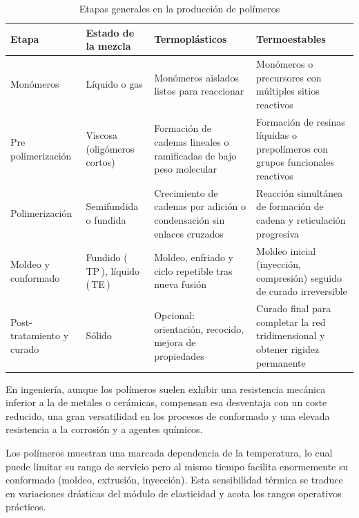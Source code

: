 \begin{table}[h]
  \centering
  \caption{Etapas generales en la producción de polímeros}
  \label{tab:etapas_polimeros}
  \begin{tabular}{|P{2.5cm}|P{3.5cm}|P{4cm}|P{4.5cm}|}
    \hline
    \textbf{Etapa}            & \textbf{Estado de la mezcla}        & \textbf{Termoplásticos}                                                    & \textbf{Termoestables}                                                        \\ \hline
    Monómeros                 & Líquido o gas                       & Monómeros aislados listos para reaccionar                                   & Monómeros o precursores con múltiples sitios reactivos                         \\ \hline
    Pre polimerización         & Viscosa (oligómeros cortos)         & Formación de cadenas lineales o ramificadas de bajo peso molecular & Formación de resinas líquidas o prepolímeros con grupos funcionales reactivos   \\ \hline
    Polimerización            & Semifundida o fundida               & Crecimiento de cadenas por adición o condensación sin enlaces cruzados       & Reacción simultánea de formación de cadena y reticulación progresiva            \\ \hline
    Moldeo y conformado       & Fundido (\,TP\,), líquido (\,TE\,)  & Moldeo, enfriado y ciclo repetible tras nueva fusión                         & Moldeo inicial (inyección, compresión) seguido de curado irreversible          \\ \hline
    Post-tratamiento y curado & Sólido                              & Opcional: orientación, recocido, mejora de propiedades                      & Curado final para completar la red tridimensional y obtener rigidez permanente  \\ \hline
  \end{tabular}
\end{table}

En ingeniería, aunque los polímeros suelen exhibir una resistencia mecánica inferior a la de metales o cerámicas, compensan esa desventaja con un coste reducido, una gran versatilidad en los procesos de conformado y una elevada resistencia a la corrosión y a agentes químicos.

Los polímeros muestran una marcada dependencia de la temperatura, lo cual puede limitar su rango de servicio pero al mismo tiempo facilita enormemente su conformado (moldeo, extrusión, inyección). Esta sensibilidad térmica se traduce en variaciones drásticas del módulo de elasticidad y acota los rangos operativos prácticos. 

